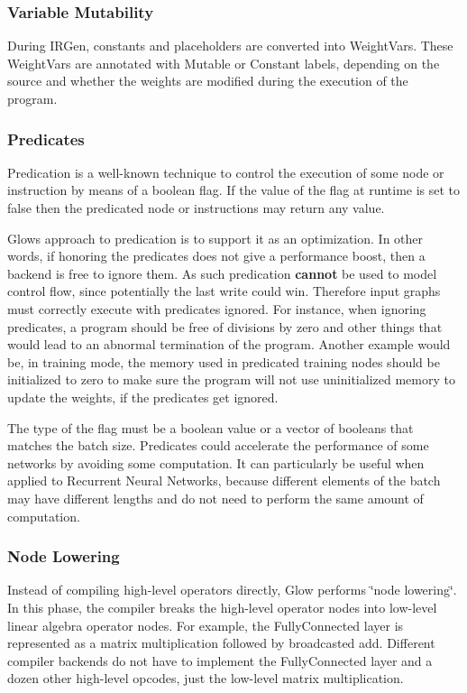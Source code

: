 \subsubsection*{Variable Mutability}

During I\+R\+Gen, constants and placeholders are converted into Weight\+Vars. These Weight\+Vars are annotated with Mutable or Constant labels, depending on the source and whether the weights are modified during the execution of the program.

\subsubsection*{Predicates}

Predication is a well-\/known technique to control the execution of some node or instruction by means of a boolean flag. If the value of the flag at runtime is set to \textquotesingle{}false\textquotesingle{} then the predicated node or instructions may return any value.

Glow\textquotesingle{}s approach to predication is to support it as an optimization. In other words, if honoring the predicates does not give a performance boost, then a backend is free to ignore them. As such predication {\bfseries cannot} be used to model control flow, since potentially the last write could win. Therefore input graphs must correctly execute with predicates ignored. For instance, when ignoring predicates, a program should be free of divisions by zero and other things that would lead to an abnormal termination of the program. Another example would be, in training mode, the memory used in predicated training nodes should be initialized to zero to make sure the program will not use uninitialized memory to update the weights, if the predicates get ignored.

The type of the flag must be a boolean value or a vector of booleans that matches the batch size. Predicates could accelerate the performance of some networks by avoiding some computation. It can particularly be useful when applied to Recurrent Neural Networks, because different elements of the batch may have different lengths and do not need to perform the same amount of computation.



\subsubsection*{Node Lowering}

Instead of compiling high-\/level operators directly, Glow performs \char`\"{}node
lowering\char`\"{}. In this phase, the compiler breaks the high-\/level operator nodes into low-\/level linear algebra operator nodes. For example, the Fully\+Connected layer is represented as a matrix multiplication followed by broadcasted add. Different compiler backends do not have to implement the Fully\+Connected layer and a dozen other high-\/level opcodes, just the low-\/level matrix multiplication.

